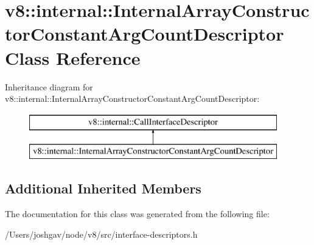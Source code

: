 \hypertarget{classv8_1_1internal_1_1_internal_array_constructor_constant_arg_count_descriptor}{}\section{v8\+:\+:internal\+:\+:Internal\+Array\+Constructor\+Constant\+Arg\+Count\+Descriptor Class Reference}
\label{classv8_1_1internal_1_1_internal_array_constructor_constant_arg_count_descriptor}
Inheritance diagram for v8\+:\+:internal\+:\+:Internal\+Array\+Constructor\+Constant\+Arg\+Count\+Descriptor\+:\begin{figure}[H]
\begin{center}
\leavevmode
\includegraphics[height=2.000000cm]{classv8_1_1internal_1_1_internal_array_constructor_constant_arg_count_descriptor}
\end{center}
\end{figure}
\subsection*{Additional Inherited Members}


The documentation for this class was generated from the following file\+:\begin{DoxyCompactItemize}
\item 
/\+Users/joshgav/node/v8/src/interface-\/descriptors.\+h\end{DoxyCompactItemize}
